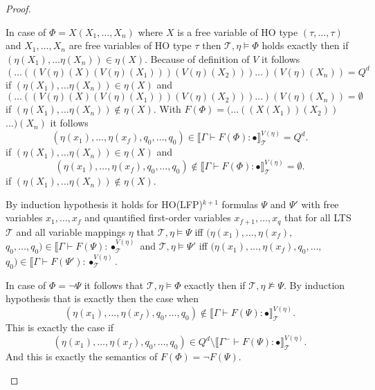 \begin{proof}
\begin{compactitem}
        \item In case of $\Phi = X(X_1, \dots, X_n)$ where $X$ is a free variable of HO type $(\tau, \dots,
        \tau)$ and $X_1, \dots, X_n$ are free variables of HO type $\tau$ then $\mathcal{T}, \eta \models \Phi$
        holds exactly then if $(\eta(X_1), \dots \eta(X_n)) \in \eta(X)$. Because of definition of $V$ it follows
        \[(\dots((V(\eta)(X)(V(\eta)(X_1)))(V(\eta)(X_2)))\dots)(V(\eta)(X_n)) = Q^d\]
        if $(\eta(X_1), \dots \eta(X_n)) \in \eta(X)$ and
        \[(\dots((V(\eta)(X)(V(\eta)(X_1)))(V(\eta)(X_2)))\dots)(V(\eta)(X_n)) = \emptyset\]
        if $(\eta(X_1), \dots \eta(X_n)) \not\in \eta(X)$. With $F(\Phi) = (\dots ((X(X_1))(X_2))$ $\dots)(X_n)$
        it follows
        \[ (\eta(x_1), \dots, \eta(x_f), q_0, \dots, q_0) \in \llbracket \Gamma \vdash F(\Phi) \colon
        \bullet \rrbracket^{V(\eta)}_\mathcal{T} = Q^d.\]
        if $(\eta(X_1), \dots \eta(X_n))\in \eta(X)$ and
        \[ (\eta(x_1), \dots, \eta(x_f), q_0, \dots, q_0) \not\in \llbracket \Gamma \vdash F(\Phi) \colon \bullet
        \rrbracket^{V(\eta)}_\mathcal{T} = \emptyset.\]
        if $(\eta(X_1), \dots \eta(X_n)) \not\in \eta(X)$.
    \end{compactitem}
    By induction hypothesis it holds for HO(LFP)$^{k+1}$ formulas $\Psi$ and $\Psi'$ with free variables $x_1, \dots,
    x_f$ and quantified first-order variables $x_{f+1}, \dots, x_q$ that for all LTS $\mathcal{T}$ and all variable
    mappings $\eta$ that $\mathcal{T}, \eta \models \Psi$ iff $ (\eta(x_1), \dots, \eta(x_f),$ $ q_0, \dots, q_0) \in
    \llbracket \Gamma \vdash F(\Psi) \colon \bullet^{V(\eta)}_\mathcal{T}$ and $\mathcal{T}, \eta \models \Psi'$ iff $
    (\eta(x_1), \dots, \eta(x_f), q_0, \dots, $ $q_0) \in \llbracket \Gamma \vdash F(\Psi') \colon \bullet^{V(\eta)
    }_\mathcal{T}$.
    \begin{compactitem}
        \item In case of $\Phi = \neg \Psi$ it follows that $\mathcal{T}, \eta \models \Phi$ exactly then if
        $\mathcal{T}, \eta \not\models \Psi$. By induction hypothesis that is exactly then the case when
        \[ (\eta(x_1), \dots, \eta(x_f), q_0, \dots, q_0) \not\in \llbracket \Gamma \vdash F(\Psi) \colon \bullet
        \rrbracket^{V(\eta)}_\mathcal{T}.\]
        This is exactly the case if
        \[ (\eta(x_1), \dots, \eta(x_f), q_0, \dots, q_0) \in Q^d \setminus \llbracket \Gamma^- \vdash F(\Psi) \colon
        \bullet \rrbracket^{V(\eta)}_\mathcal{T}.\]
        And this is exactly the semantics of $F(\Phi) = \neg F(\Psi)$.


\end{compactitem}
\end{proof}
